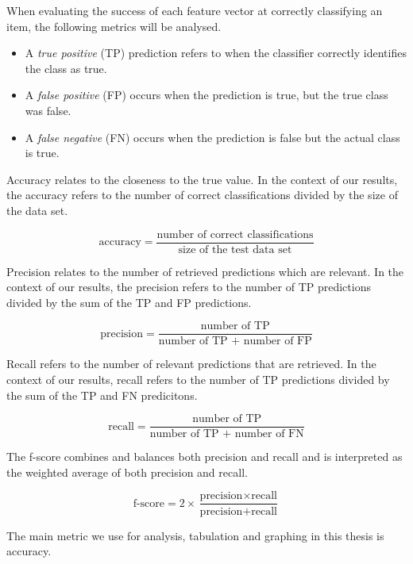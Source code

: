 When evaluating the success of each feature vector at correctly classifying an item, the following metrics will be analysed.

\begin{itemize}
\item A \emph{true positive} (TP) prediction refers to when the classifier correctly identifies the class as true. 
\item A \emph{false positive} (FP) occurs when the prediction is true, but the true class was false. 
\item A \emph{false negative} (FN) occurs when the prediction is false but the actual class is true.
\end{itemize}

Accuracy relates to the closeness to the true value. In the context of our results, the accuracy refers to the number of correct classifications 
divided by the size of the data set.

\[ \text{accuracy} = \frac{\text{number of correct classifications}}{\text{size of the test data set}}\]

Precision relates to the number of retrieved predictions which are relevant. In the context of our results, the precision refers to the number of TP predictions 
divided by the sum of the TP and FP predictions.

\[ \text{precision} = \frac{\text{number of TP}}{\text{number of TP + number of FP}}\]

Recall refers to the number of relevant predictions that are retrieved. In the context of our results, recall refers to the number of TP predictions 
divided by the sum of the TP and FN predicitons.

\[ \text{recall} = \frac{\text{number of TP}}{\text{number of TP + number of FN}}\]

The f-score combines and balances both precision and recall and is interpreted as the weighted average of both precision and recall. 

\[ \text{f-score} = 2 \times \frac{\text{precision} \times \text{recall}}{\text{precision} + \text{recall}}\]

The main metric we use for analysis, tabulation and graphing in this thesis is accuracy.

